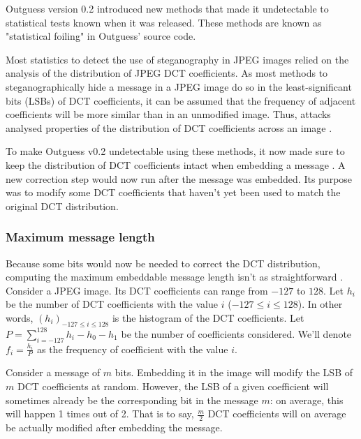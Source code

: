 \documentclass{article}
\begin{document}
Outguess version 0.2 introduced new methods that made it undetectable to statistical tests known when it was released\cite{def01}. These methods are known as "statistical foiling" in Outguess' source code. 

Most statistics to detect the use of steganography in JPEG images relied on the analysis of the distribution of JPEG DCT coefficients. As most methods to steganographically hide a message in a JPEG image do so in the least-significant bits (LSBs) of DCT coefficients, it can be assumed that the frequency of adjacent coefficients will be more similar than in an unmodified image. Thus, attacks analysed properties of the distribution of DCT coefficients across an image \cite{det01}.

To make Outguess v0.2 undetectable using these methods, it now made sure to keep the distribution of DCT coefficients intact when embedding a message \cite{def01}. A new correction step would now run after the message was embedded. Its purpose was to modify some DCT coefficients that haven't yet been used to match the original DCT distribution.

\subsubsection{Maximum message length}

Because some bits would now be needed to correct the DCT distribution, computing the maximum embeddable message length isn't as straightforward \cite{def01}\cite{att02}. Consider a JPEG image. Its DCT coefficients can range from $-127$ to $128$. Let $h_i$ be the number of DCT coefficients with the value $i$ ($-127 \le i \le 128$). In other words, $(h_i)_{-127 \le i \le 128}$ is the histogram of the DCT coefficients. Let $P = \sum_{i = -127}^{128} h_i - h_0 - h_1$ be the number of coefficients considered. We'll denote $f_i = \frac {h_i} P$ as the frequency of coefficient with the value $i$.

Consider a message of $m$ bits. Embedding it in the image will modify the LSB of $m$ DCT coefficients at random. However, the LSB of a given coefficient will sometimes already be the corresponding bit in the message $m$: on average, this will happen 1 times out of 2. That is to say, $\frac m 2$ DCT coefficients will on average be actually modified after embedding the message.
\end{document}
